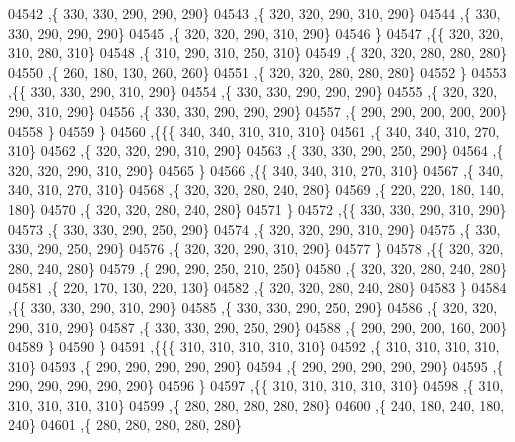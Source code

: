 \begin{DoxyCode}
04542     ,\{   330,   330,   290,   290,   290\}
04543     ,\{   320,   320,   290,   310,   290\}
04544     ,\{   330,   330,   290,   290,   290\}
04545     ,\{   320,   320,   290,   310,   290\}
04546     \}
04547    ,\{\{   320,   320,   310,   280,   310\}
04548     ,\{   310,   290,   310,   250,   310\}
04549     ,\{   320,   320,   280,   280,   280\}
04550     ,\{   260,   180,   130,   260,   260\}
04551     ,\{   320,   320,   280,   280,   280\}
04552     \}
04553    ,\{\{   330,   330,   290,   310,   290\}
04554     ,\{   330,   330,   290,   290,   290\}
04555     ,\{   320,   320,   290,   310,   290\}
04556     ,\{   330,   330,   290,   290,   290\}
04557     ,\{   290,   290,   200,   200,   200\}
04558     \}
04559    \}
04560   ,\{\{\{   340,   340,   310,   310,   310\}
04561     ,\{   340,   340,   310,   270,   310\}
04562     ,\{   320,   320,   290,   310,   290\}
04563     ,\{   330,   330,   290,   250,   290\}
04564     ,\{   320,   320,   290,   310,   290\}
04565     \}
04566    ,\{\{   340,   340,   310,   270,   310\}
04567     ,\{   340,   340,   310,   270,   310\}
04568     ,\{   320,   320,   280,   240,   280\}
04569     ,\{   220,   220,   180,   140,   180\}
04570     ,\{   320,   320,   280,   240,   280\}
04571     \}
04572    ,\{\{   330,   330,   290,   310,   290\}
04573     ,\{   330,   330,   290,   250,   290\}
04574     ,\{   320,   320,   290,   310,   290\}
04575     ,\{   330,   330,   290,   250,   290\}
04576     ,\{   320,   320,   290,   310,   290\}
04577     \}
04578    ,\{\{   320,   320,   280,   240,   280\}
04579     ,\{   290,   290,   250,   210,   250\}
04580     ,\{   320,   320,   280,   240,   280\}
04581     ,\{   220,   170,   130,   220,   130\}
04582     ,\{   320,   320,   280,   240,   280\}
04583     \}
04584    ,\{\{   330,   330,   290,   310,   290\}
04585     ,\{   330,   330,   290,   250,   290\}
04586     ,\{   320,   320,   290,   310,   290\}
04587     ,\{   330,   330,   290,   250,   290\}
04588     ,\{   290,   290,   200,   160,   200\}
04589     \}
04590    \}
04591   ,\{\{\{   310,   310,   310,   310,   310\}
04592     ,\{   310,   310,   310,   310,   310\}
04593     ,\{   290,   290,   290,   290,   290\}
04594     ,\{   290,   290,   290,   290,   290\}
04595     ,\{   290,   290,   290,   290,   290\}
04596     \}
04597    ,\{\{   310,   310,   310,   310,   310\}
04598     ,\{   310,   310,   310,   310,   310\}
04599     ,\{   280,   280,   280,   280,   280\}
04600     ,\{   240,   180,   240,   180,   240\}
04601     ,\{   280,   280,   280,   280,   280\}

\end{DoxyCode}
